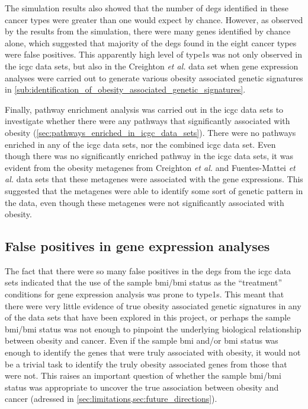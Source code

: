 The simulation results also showed that the number of \glspl{deg} identified in these cancer types were greater than one would expect by chance.
However, as observed by the results from the simulation, there were many genes identified by chance alone, which suggested that majority of the \glspl{deg} found in the eight cancer types were false positives.
This apparently high level of \Glspl{type1} was not only observed in the \gls{icgc} data sets, but also in the Creighton \textit{et al.} data set when gene expression analyses were carried out to generate various obesity associated genetic signatures in \cref{sub:identification_of_obesity_associated_genetic_signatures}.

Finally, pathway enrichment analysis was carried out in the \gls{icgc} data sets to investigate whether there were any pathways that significantly associated with obesity (\cref{sec:pathways_enriched_in_icgc_data_sets}).
There were no pathways enriched in any of the \gls{icgc} data sets, nor the combined \gls{icgc} data set.
Even though there was no significantly enriched  pathway in the \gls{icgc} data sets, it was evident from the obesity metagenes from Creighton \textit{et al.} and Fuentes-Mattei \textit{et al.} data sets that these metagenes were associated with the gene expressions.
This suggested that the metagenes were able to identify some sort of genetic pattern in the data, even though these metagenes were not significantly associated with obesity.

\subsection{False positives in gene expression analyses}
\label{sub:false_positives_in_gene_expression_analyses}

The fact that there were so many false positives in the \glspl{deg} from the \gls{icgc} data sets indicated that the use of the sample \gls{bmi}/\gls{bmi} status as the ``treatment'' conditions for gene expression analysis was prone to \Glspl{type1}.
This meant that there were very little evidence of true obesity associated genetic signatures in any of the data sets that have been explored in this project, or perhaps the sample \gls{bmi}/\gls{bmi} status was not enough to pinpoint the underlying biological relationship between obesity and cancer.
Even if the sample \gls{bmi} and/or \gls{bmi} status was enough to identify the genes that were truly associated with obesity, it would not be a trivial task to identify the truly obesity associated genes from those that were not.
This raises an important question of whether the sample \gls{bmi}/\gls{bmi} status was appropriate to uncover the true association between obesity and cancer (adressed in \cref{sec:limitations,sec:future_directions}).

